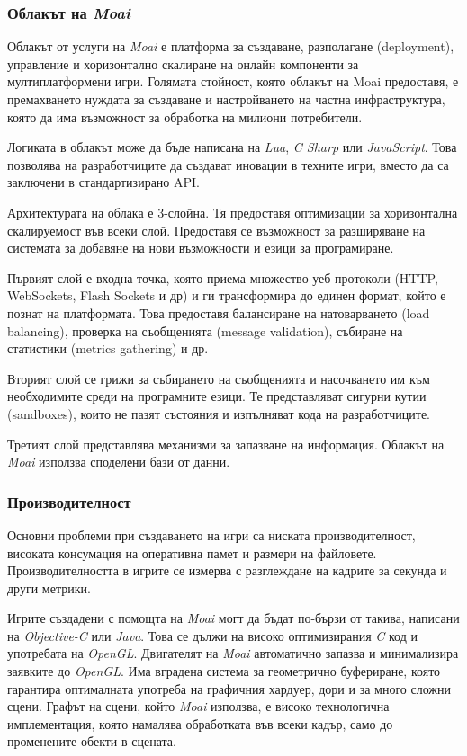 		\subsubsection{Облакът на \emph{Moai}}
		
			Облакът от услуги на \emph{Moai} е платформа за създаване, разполагане (deployment), управление и 
			хоризонтално скалиране на онлайн компоненти за мултиплатформени игри. Голямата стойност, която облакът
			на Moai предоставя, е премахването нуждата за създаване и настройването на частна инфраструктура, която
			да има възможност за обработка на милиони потребители.
			
			Логиката в облакът може да бъде написана на \emph{Lua}, \emph{C Sharp} или \emph{JavaScript}.
			Това позволява на разработчиците да създават иновации в техните игри, вместо да са заключени
			в стандартизирано \ac{API}.
			
			Архитектурата на облака е 3-слойна. Тя предоставя оптимизации за хоризонтална скалируемост във
			всеки слой. Предоставя се възможност за разширяване на системата за добавяне на нови възможности
			и езици за програмиране.
			
			Първият слой е входна точка, която приема множество уеб протоколи (HTTP, WebSockets, Flash Sockets и др) и ги 
			трансформира до единен формат, който е познат на платформата. Това предоставя балансиране на натоварването (load balancing),
			проверка на съобщенията (message validation), събиране на статистики (metrics gathering) и др.
			
			Вторият слой се грижи за събирането на съобщенията и насочването им към необходимите среди на програмните езици.
			Те представляват сигурни кутии (sandboxes), които не пазят състояния и изпълняват кода на разработчиците.
			
			Третият слой представлява механизми за запазване на информация. Облакът на \emph{Moai} използва споделени
			бази от данни.
			
		\subsubsection{Производителност}
		
			Основни проблеми при създаването на игри са ниската производителност, високата консумация на оперативна памет
			и размери на файловете. Производителността в игрите се измерва с разглеждане на кадрите за секунда и други метрики.
			
			Игрите създадени с помощта на \emph{Moai} могт да бъдат по-бързи от такива, написани на \emph{Objective-C} или \emph{Java}.
			Това се дължи на високо оптимизирания \emph{C} код и употребата на \emph{OpenGL}. Двигателят на \emph{Moai} автоматично
			запазва и минимализира заявките до \emph{OpenGL}. Има вградена система за геометрично буфериране, която гарантира
			оптималната употреба на графичния хардуер, дори и за много сложни сцени. Графът на сцени, който \emph{Moai} използва,
			е високо технологична имплементация, която намалява обработката във всеки кадър, само до променените обекти в сцената.
			
